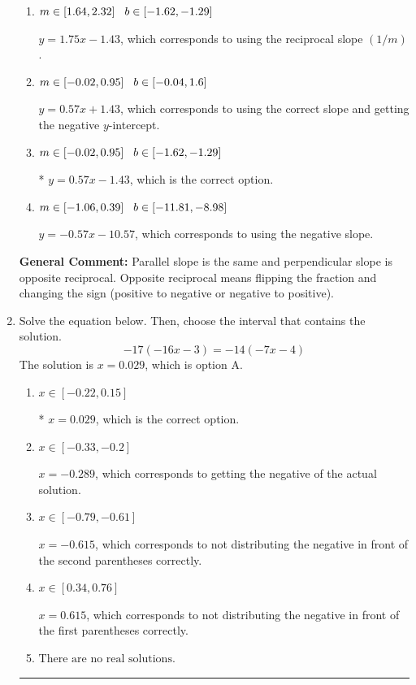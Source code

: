 \documentclass{extbook}[14pt]
\newcommand{\litem}[1]{\item #1

\rule{\textwidth}{0.4pt}}
\begin{document}
\begin{enumerate}
{\begin{enumerate}[label=\Alph*.]
 $y = 0.57x + 2.00$, which corresponds to correct slope and mis-distributing while simplifying to slope-intercept form.
\item \( m \in [1.64, 2.32] \hspace*{3mm} b \in [-1.62, -1.29] \)

 $y = 1.75x - 1.43$, which corresponds to using the reciprocal slope $(1/m)$.
\item \( m \in [-0.02, 0.95] \hspace*{3mm} b \in [-0.04, 1.6] \)

 $y = 0.57x + 1.43$, which corresponds to using the correct slope and getting the negative $y$-intercept.
\item \( m \in [-0.02, 0.95] \hspace*{3mm} b \in [-1.62, -1.29] \)

* $y = 0.57x - 1.43$, which is the correct option.
\item \( m \in [-1.06, 0.39] \hspace*{3mm} b \in [-11.81, -8.98] \)

 $y = -0.57x - 10.57$, which corresponds to using the negative slope.
\end{enumerate}

\textbf{General Comment:} Parallel slope is the same and perpendicular slope is opposite reciprocal. Opposite reciprocal means flipping the fraction and changing the sign (positive to negative or negative to positive).
}
\litem{
Solve the equation below. Then, choose the interval that contains the solution.
\[ -17(-16x -3) = -14(-7x -4) \]The solution is \( x = 0.029 \), which is option A.\begin{enumerate}[label=\Alph*.]
\item \( x \in [-0.22, 0.15] \)

* $x = 0.029$, which is the correct option.
\item \( x \in [-0.33, -0.2] \)

$x = -0.289$, which corresponds to getting the negative of the actual solution.
\item \( x \in [-0.79, -0.61] \)

$x = -0.615$, which corresponds to not distributing the negative in front of the second parentheses correctly.
\item \( x \in [0.34, 0.76] \)

$x = 0.615$, which corresponds to not distributing the negative in front of the first parentheses correctly.
\item \( \text{There are no real solutions.} \)


\end{enumerate}}
\end{enumerate}
\end{document}
